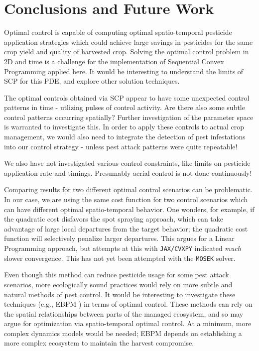 \documentclass[11pt]{article}
\begin{document}
\section{Conclusions and Future Work}

Optimal control is capable of computing optimal spatio-temporal pesticide application strategies which could achieve large savings in pesticides for the same crop yield and quality of harvested crop. Solving the optimal control problem in 2D and time is a challenge for the implementation of Sequential Convex Programming applied here. It would be interesting to understand the limits of SCP for this PDE, and explore other solution techniques.

The optimal controls obtained via SCP appear to have some unexpected control patterns in time - utlizing pulses of control activity. Are there also some subtle control patterns occurring spatially? Further investigation of the parameter space is warranted to investigate this. In order to apply these controls to actual crop management, we would also need to integrate the detection of pest infestations into our control strategy - unless pest attack patterns were quite repeatable!

We also have not investigated various control constraints, like limits on pesticide application rate and timings. Presumably aerial control is not done continuously!

Comparing results for two different optimal control scenarios can be problematic. In our case, we are using the same cost function for two control scenarios which can have different optimal spatio-temporal behavior. One wonders, for example, if the quadratic cost disfavors the spot spraying approach, which can take advantage of large local departures from the target behavior; the quadratic cost function will selectively penalize larger departures. This argues for a Linear Programming approach, but attempts at this with \texttt{JAX/CVXPY} indicated \textit{much} slower convergence. This has not yet been attempted with the \texttt{MOSEK} solver.

Even though this method can reduce pesticide usage for some pest attack scenarios, more ecologically sound practices would rely on more subtle and natural methods of pest control. It would be interesting to investigate these techniques (e.g., EBPM \cite{R3}) in terms of optimal control. These methods can rely on the spatial relationships between parts of the managed ecosystem, and so may argue for optimization via spatio-temporal optimal control. At a minimum, more complex dynamics models would be needed; EBPM depends on establishing a more complex ecosystem to maintain the harvest compromise. 
\end{document}
